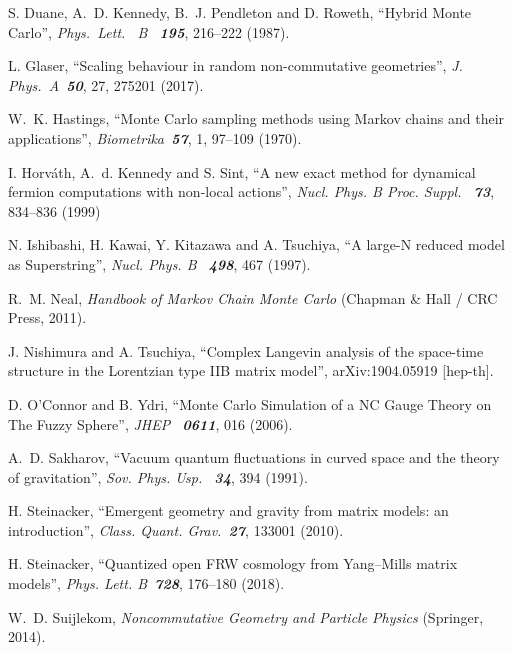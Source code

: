 \documentclass[12pt,a4paper]{article}
\begin{document}
\begin{thebibliography}{99}
S. Duane, A.~D. Kennedy, B.~J. Pendleton and D. Roweth,
``Hybrid Monte Carlo'',
{\it Phys.\ Lett. \ B \ \bf 195}, 216--222 (1987).

L. Glaser,
``Scaling behaviour in random non-commutative geometries'',
{\it J. Phys.\ A\ \bf 50}, 27, 275201 (2017).

W.~K. Hastings,
``Monte  Carlo sampling  methods using  Markov chains  and their applications'',
{\it Biometrika\ \bf 57}, 1, 97--109 (1970).

I. Horv\'{a}th, A.~d. Kennedy and S. Sint,
``A new exact method for dynamical fermion computations with non-local actions'',
{\it Nucl. Phys. B Proc. Suppl. \ \bf 73}, 834--836 (1999)

N. Ishibashi, H. Kawai, Y. Kitazawa and A. Tsuchiya,
``A large-N reduced model as Superstring'',
{\it Nucl. Phys. B \ \bf 498}, 467 (1997).

R.~M. Neal,
{\it Handbook of Markov Chain Monte Carlo\/}
(Chapman \& Hall / CRC Press, 2011).

J. Nishimura and A. Tsuchiya,
``Complex Langevin analysis of the space-time structure in the Lorentzian type IIB matrix model'',
arXiv:1904.05919 [hep-th].

D. O’Connor and B. Ydri,
``Monte Carlo Simulation of a NC Gauge Theory on The Fuzzy Sphere'',
{\it JHEP \ \bf 0611}, 016 (2006).

A.~D. Sakharov,
``Vacuum quantum fluctuations in curved space and the theory of gravitation'',
{\it Sov. Phys. Usp. \ \bf 34}, 394 (1991).

H. Steinacker,
``Emergent geometry and gravity from matrix models: an introduction'',
{\it Class. Quant. Grav.\ \bf 27}, 133001 (2010).

H. Steinacker,
``Quantized open FRW cosmology from Yang–Mills matrix models'',
{\it Phys. Lett. B\ \bf 728}, 176--180 (2018).

W.~D. Suijlekom,
{\it Noncommutative Geometry and Particle Physics\/}
(Springer, 2014).






 
 
\end{thebibliography}
\end{document}
